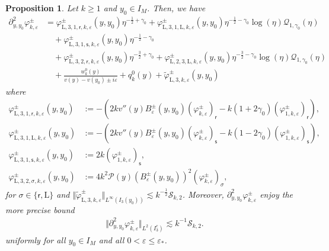 \documentclass[11pt,reqno]{amsproc}
\newtheorem{proposition}{Proposition}[section]
\theoremstyle{definition}
\numberwithin{equation}{section}
\newcommand{\rL}{{\mathrm{L}}}
\newcommand{\Q}{{\mathcal{Q}}}
\newcommand{\sr}{{\mathsf{r}}}
\newcommand{\s}{{\mathsf{s}}}
\newcommand{\cS}{{\mathcal S}}
\newcommand{\ep}{\varepsilon}
\renewcommand{\P}{{\mathcal{P}}}
\begin{document}
\begin{proposition}\label{prop:LXkpypynotvarphi}
Let $k\geq 1$ and $y_0\in I_M$. Then, we have
\begin{equation}\label{eq:decomLXkpypynotvarphi}
\begin{split}
\partial_{y,y_0}^2\varphi_{k,\ep}^\pm &= \varphi_{\rL,3,1,\sr,k,\ep}^\pm(y,y_0) \eta^{-\frac12+\gamma_0} + \varphi_{\rL,3,1,\rL,k,\ep}^\pm(y,y_0) \eta^{-\frac12-\gamma_0}\log(\eta)\Q_{1,\gamma_0}(\eta) \\
&\quad+ \varphi_{\rL,3,1,\s,k,\ep}^\pm(y,y_0) \eta^{-\frac12-\gamma_0} \\
&\quad + \varphi_{\rL,3,2,\sr,k,\ep}^\pm(y,y_0) \eta^{-\frac32+\gamma_0} + \varphi_{\rL,2,3,\rL,k,\ep}^\pm(y,y_0) \eta^{-\frac32-\gamma_0}\log(\eta) \Q_{1,\gamma_0}(\eta) \\ 
&\quad + \frac{w_k^0(y)}{v(y) - v(y_0) \pm i\ep} + q_k^0(y) + \widetilde\varphi_{\rL,3,k,\ep}^\pm(y,y_0) 
\end{split}
\end{equation}
where
\begin{align*}
\varphi_{\rL,3,1,\sr,k,\ep}^\pm(y,y_0) &:= -\left( 2kv''(y)B_{\ep}^\pm(y,y_0)  \left( \varphi_{k,\ep}^\pm \right)_\sr - k(1+2\gamma_0) \left( \varphi_{1,k,\ep}^\pm \right)_\sr \right),  \\
\varphi_{\rL,3,1,\rL,k,\ep}^\pm(y,y_0) &:= -\left( 2kv''(y)B_{\ep}^\pm(y,y_0)  \left( \varphi_{k,\ep}^\pm \right)_\s - k(1-2\gamma_0) \left( \varphi_{1,k,\ep}^\pm \right)_\s \right), \\
\varphi_{\rL,3,1,\s,k,\ep}^\pm(y,y_0) &:= 2k \left( \varphi_{1,k,\ep}^\pm \right)_\s , \\
\varphi_{\rL,3,2,\sigma,k,\ep}^\pm(y,y_0) &:=  4k^2\P(y) (B_{\ep}^\pm(y,y_0))^2  \left( \varphi_{k,\ep}^\pm \right)_\sigma, 
\end{align*}
for $\sigma \in \lbrace \sr, \rL \rbrace$ and $\Vert \widetilde{\varphi}_{\rL, 3,k,\ep}^\pm \Vert_{L^\infty(I_3(y_0))} \lesssim k^{-\frac12}\cS_{k,2}$. Moreover, $\partial_{y,y_0}^2\varphi_{k,\ep}^\pm$ enjoy the more precise bound
\begin{align*}
\Vert \partial_{y,y_0}^2\varphi_{k,\ep}^\pm \Vert_{L^2(I_3^c)} \lesssim  k^{-1}\cS_{k,2}.
\end{align*}
uniformly for all $y_0\in I_M$ and all $0 < \ep\leq \ep_*$.
\end{proposition}
\end{document}
